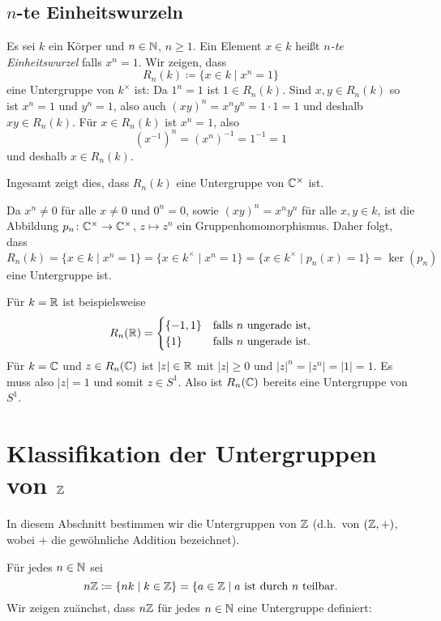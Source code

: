 \subsection{\texorpdfstring{$n$}{n}-te Einheitswurzeln}
Es sei $k$ ein Körper und $n \in \mathbb{N}$, $n \geq 1$. Ein Element $x \in k$ heißt \emph{$n$-te Einheitswurzel} falls $x^n = 1$. Wir zeigen, dass
\[
 R_n(k) \coloneqq \{x \in k \mid x^n = 1\}
\]
eine Untergruppe von $k^\times$ ist: Da $1^n = 1$ ist $1 \in R_n(k)$. Sind $x,y \in R_n(k)$ so ist $x^n = 1$ und $y^n = 1$, also auch $(xy)^n = x^n y^n = 1 \cdot 1 = 1$ und deshalb $xy \in R_n(k)$. Für $x \in R_n(k)$ ist $x^n = 1$, also
\[
 (x^{-1})^n = (x^n)^{-1} = 1^{-1} = 1
\]
und deshalb $x \in R_n(k)$.

Ingesamt zeigt dies, dass $R_n(k)$ eine Untergruppe von $\mathbb{C}^\times$ ist.

\begin{bem}
 Da $x^n \neq 0$ für alle $x \neq 0$ und $0^n = 0$, sowie $(xy)^n = x^n y^n$ für alle $x,y \in k$, ist die Abbildung $p_n \colon \mathbb{C}^\times \to \mathbb{C}^\times$, $z \mapsto z^n$ ein Gruppenhomomorphismus. Daher folgt, dass
 \[
  R_n(k)
  = \{x \in k \mid x^n = 1\}
  = \{x \in k^\times \mid x^n = 1\}
  = \{x \in k^\times \mid p_n(x) = 1\}
  = \ker(p_n)
 \]
 eine Untergruppe ist.
\end{bem}


Für $k = \mathbb{R}$ ist beispielsweise
\[
 R_n(\mathbb{R})
 =
 \begin{cases}
  \{-1,1\} & \text{falls $n$ ungerade ist},\\
     \{1\} & \text{falls $n$ ungerade ist}.
 \end{cases}
\]
Für $k = \mathbb{C}$ und $z \in R_n(\mathbb{C})$ ist $|z| \in \mathbb{R}$ mit $|z| \geq 0$ und $|z|^n = |z^n| = |1| = 1$. Es muss also $|z| = 1$ und somit $z \in S^1$. Also ist $R_n(\mathbb{C})$ bereits eine Untergruppe von $S^1$.





\section{Klassifikation der Untergruppen von \texorpdfstring{$\mathbb{Z}$}{Z}}
In diesem Abschnitt bestimmen wir die Untergruppen von $\mathbb{Z}$ (d.h.\ von $(\mathbb{Z},+)$, wobei $+$ die gewöhnliche Addition bezeichnet).

Für jedes $n \in \mathbb{N}$ sei
\[
 n \mathbb{Z}
 \coloneqq \{n k \mid k \in \mathbb{Z}\}
 = \{a \in \mathbb{Z} \mid \text{$a$ ist durch $n$ teilbar}.
\]
Wir zeigen zuänchst, dass $n \mathbb{Z}$ für jedes $n \in \mathbb{N}$ eine Untergruppe definiert:

